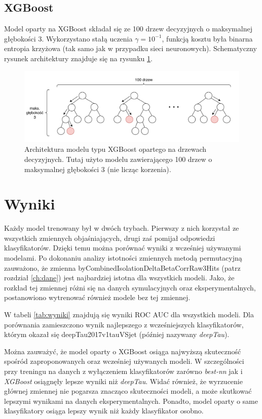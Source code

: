 \documentclass{pracalicmgr}
\begin{document}
	
	\section{XGBoost}
	Model oparty na XGBoost składał się ze 100 drzew decyzyjnych o maksymalnej głębokości 3. Wykorzystano stałą uczenia $\gamma = 10^{-1}$, funkcją kosztu była binarna entropia krzyżowa (tak samo jak w przypadku sieci neuronowych). Schematyczny rysunek architektury znajduje się na rysunku \ref{fig:xgb}.
	
	\begin{figure}[H]
	\centering
	\includegraphics[width=1.0\textwidth]{xgb.pdf}
	\caption{Architektura modelu typu XGBoost opartego na drzewach decyzyjnych. Tutaj użyto modelu zawierającego 100 drzew o maksymalnej głębokości 3 (nie licząc korzenia).}
	\label{fig:xgb}
	\end{figure}
    
    \chapter{Wyniki}
    Każdy model trenowany był w dwóch trybach. Pierwszy z nich korzystał ze wszystkich zmiennych objaśniających, drugi zaś pomijał odpowiedzi klasyfikatorów. Dzięki temu można porównać wyniki z wcześniej używanymi modelami. Po dokonaniu analizy istotności zmiennych metodą permutacyjną zauważono, że zmienna byCombinedIsolationDeltaBetaCorrRaw3Hits (patrz rozdział \ref{ch:dane}) jest najbardziej istotna dla wszystkich modeli. Jako, że rozkład tej zmiennej różni się na danych symulacyjnych oraz eksperymentalnych, postanowiono wytrenować również modele bez tej zmiennej.
    
	W tabeli \ref{tab:wyniki} znajdują się wyniki ROC AUC dla wszystkich modeli. Dla porównania zamieszczono wynik najlepszego z wcześniejszych klasyfikatorów, którym okazał się deepTau2017v1tauVSjet (później nazywany \textit{deepTau}). 
	
	Można zauważyć, że model oparty o XGBoost osiąga najwyższą skuteczność spośród zaproponowanych oraz wcześniej używanych modeli. W szczególności przy treningu na danych z wyłączeniem klasyfikatorów zarówno \textit{best-nn} jak i \textit{XGBoost} osiągnęły lepsze wyniki niż \textit{deepTau}. Widać również, że wyrzucenie głównej zmiennej nie pogarsza znacząco skuteczności modeli, a może skutkować lepszymi wynikami na danych eksperymentalnych. Ponadto, model oparty o same klasyfikatory osiąga lepszy wynik niż każdy klasyfikator osobno.
	
\end{document}
